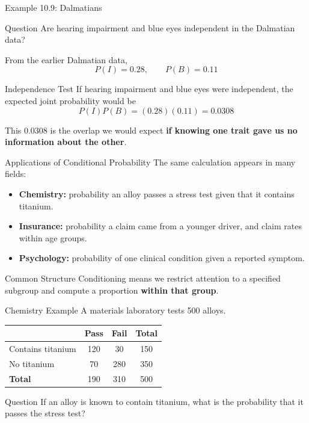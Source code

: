 \documentclass[aspectratio=169]{beamer}
\begin{document}
\begin{frame}{Example 10.9: Dalmatians}
\begin{block}{Question}
Are hearing impairment and blue eyes independent in the Dalmatian data?
\end{block}

From the earlier Dalmatian data,
$$P(I)=0.28,\qquad P(B)=0.11$$
  
\begin{block}{Independence Test}
If hearing impairment and blue eyes were independent, the expected joint probability would be
$$P(I)P(B)=(0.28)(0.11)=\mathbf{0.0308}$$
\end{block}
  
This $0.0308$ is the overlap we would expect \textbf{if knowing one trait gave us no information about the other}.
\end{frame}

\begin{frame}{Applications of Conditional Probability}
The same calculation appears in many fields:
\begin{itemize}
	\item \textbf{Chemistry:} probability an alloy passes a stress test given that it contains titanium.
	\item \textbf{Insurance:} probability a claim came from a younger driver, and claim rates within age groups.
	\item \textbf{Psychology:} probability of one clinical condition given a reported symptom.
\end{itemize}
\vspace{0.2cm}
\begin{block}{Common Structure}
Conditioning means we restrict attention to a specified subgroup and compute a proportion \textbf{within that group}.
\end{block}
\end{frame}

\begin{frame}{Chemistry Example}
A materials laboratory tests 500 alloys.
\begin{table}
\centering
\small
\begin{tabular}{lccc}
\toprule
& \textbf{Pass} & \textbf{Fail} & \textbf{Total} \\
\midrule
Contains titanium & 120 & 30 & 150 \\
No titanium & 70 & 280 & 350 \\
\midrule
\textbf{Total} & 190 & 310 & 500 \\
\bottomrule
\end{tabular}
\end{table}

\begin{block}{Question}
If an alloy is known to contain titanium, what is the probability that it passes the stress test?
\end{block}
\end{frame}
\end{document}
